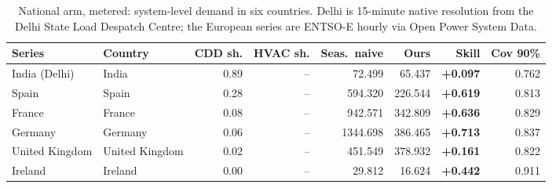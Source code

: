 \begin{table}[t]
\centering
\footnotesize
\setlength{\tabcolsep}{3.5pt}
\begin{tabular}{llrrrrrr}
\toprule
Series & Country & CDD sh. & HVAC sh. & Seas.\ naive & Ours & Skill & Cov 90\% \\
\midrule
India (Delhi) & India & 0.89 & -- & 72.499 & 65.437 & \textbf{+0.097} & 0.762 \\
Spain & Spain & 0.28 & -- & 594.320 & 226.544 & \textbf{+0.619} & 0.813 \\
France & France & 0.08 & -- & 942.571 & 342.809 & \textbf{+0.636} & 0.829 \\
Germany & Germany & 0.06 & -- & 1344.698 & 386.465 & \textbf{+0.713} & 0.837 \\
United Kingdom & United Kingdom & 0.02 & -- & 451.549 & 378.932 & \textbf{+0.161} & 0.822 \\
Ireland & Ireland & 0.00 & -- & 29.812 & 16.624 & \textbf{+0.442} & 0.911 \\
\bottomrule
\end{tabular}
\caption{National arm, metered: system-level demand in six countries. Delhi is 15-minute native resolution from the Delhi State Load Despatch Centre; the European series are ENTSO-E hourly via Open Power System Data.}
\label{tab:national}
\end{table}
